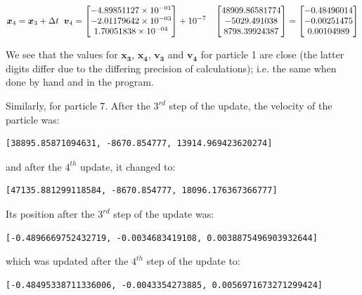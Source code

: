 \documentclass[12pt]{article}
\begin{document}
\begin{tcolorbox}
	$$\boldsymbol{x}_{4} = \boldsymbol{x}_{3} + \Delta t \hspace{0.2cm}\boldsymbol{v}_{4} = \begin{bmatrix}
	-4.89851127 \times 10^{-01} \\ -2.01179642\times 10^{-03} \\  1.70051838\times 10^{-04}
\end{bmatrix} + 10^{-7} \hspace{0.2cm}\ \begin{bmatrix}
48909.86581774 \\ -5029.491038 \\  8798.39924387
\end{bmatrix} = \begin{bmatrix}
-0.48496014 \\ -0.00251475 \\  0.00104989
\end{bmatrix}$$
\end{tcolorbox}
We see that the values for $\boldsymbol{x_{3}}$, $\boldsymbol{x_{4}}$, $\boldsymbol{v_{3}}$ and $\boldsymbol{v_{4}}$ for particle 1 are close (the latter digits differ due to the differing precision of calculations); i.e. the same when done by hand and in the program.

\noindent Similarly, for particle 7. After the $3^{rd}$ step of the update, the velocity of the particle was:
\begin{tcolorbox}
	\begin{verbatim}
[38895.85871094631, -8670.854777, 13914.969423620274]
\end{verbatim}
\end{tcolorbox}
and after the $4^{th}$ update, it changed to:
\begin{tcolorbox}
	\begin{verbatim}
[47135.881299118584, -8670.854777, 18096.176367366777]
\end{verbatim}
\end{tcolorbox}
Its position after the $3^{rd}$ step of the update was:
\begin{tcolorbox}
	\begin{verbatim}
[-0.4896669752432719, -0.0034683419108, 0.0038875496903932644] 
\end{verbatim}
\end{tcolorbox}
which was updated after the $4^{th}$ step of the update to:
\begin{tcolorbox}
	\begin{verbatim}
[-0.48495338711336006, -0.0043354273885, 0.0056971673271299424]
\end{verbatim}
\end{tcolorbox}
\end{document}
